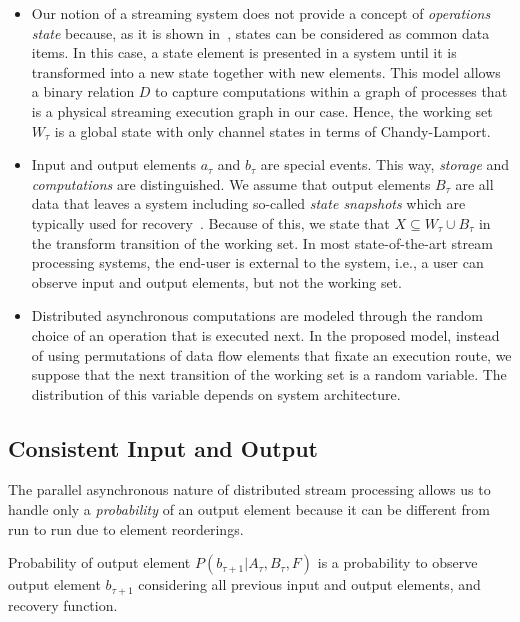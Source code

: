 \begin{itemize}
    \item Our notion of a streaming system does not provide a concept of {\em operations state} because, as it is shown in~\cite{we2018adbis}, states can be considered as common data items. In this case, a state element is presented in a system until it is transformed into a new state together with new elements. This model allows a binary relation $D$ to capture computations within a graph of processes that is a physical streaming execution graph in our case. Hence, the working set $W_\tau$ is a global state with only channel states in terms of Chandy-Lamport.
    \item Input and output elements $a_\tau$ and $b_\tau$ are special events. This way, {\em storage} and {\em computations} are distinguished. We assume that output elements $B_\tau$ are all data that leaves a system including so-called {\em state snapshots} which are typically used for recovery~\cite{Carbone:2017:SMA:3137765.3137777}. Because of this, we state that $X \subseteq W_\tau \cup B_\tau$ in the transform transition of the working set. In most state-of-the-art stream processing systems, the end-user is external to the system, i.e., a user can observe input and output elements, but not the working set.
    \item Distributed asynchronous computations are modeled through the random choice of an operation that is executed next. In the proposed model, instead of using permutations of data flow elements that fixate an execution route, we suppose that the next transition of the working set is a random variable. The distribution of this variable depends on system architecture. 
\end{itemize}

\subsection{Consistent Input and Output}

The parallel asynchronous nature of distributed stream processing allows us to handle only a {\em probability} of an output element because it can be different from run to run due to element reorderings.

\begin{definition}{Probability of output element}
$P(b_{\tau+1}|A_{\tau}, B_\tau, F)$ is a probability to observe output element $b_{\tau+1}$ considering all previous input and output elements, and recovery function.
\end{definition}

